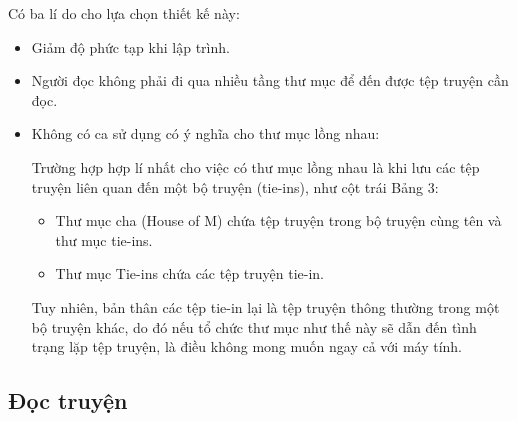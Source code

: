 \documentclass[../../thesis]{subfiles}
\begin{document}
Có ba lí do cho lựa chọn thiết kế này:

\begin{itemize}
    \item
        Giảm độ phức tạp khi lập trình.
    \item
        Người đọc không phải đi qua nhiều tầng thư mục để đến được tệp truyện
        cần đọc.
    \item
        Không có ca sử dụng có ý nghĩa cho thư mục lồng nhau:

        Trường hợp hợp lí nhất cho việc có thư mục lồng nhau là khi lưu các tệp
        truyện liên quan đến một bộ truyện (tie-ins), như cột trái Bảng 3:

        \begin{itemize}
            \item
                Thư mục cha (House of M) chứa tệp truyện trong bộ truyện cùng
                tên và thư mục tie-ins.
            \item
                Thư mục Tie-ins chứa các tệp truyện tie-in.
        \end{itemize}

        Tuy nhiên, bản thân các tệp tie-in lại là tệp truyện thông thường trong
        một bộ truyện khác, do đó nếu tổ chức thư mục như thế này sẽ dẫn đến
        tình trạng lặp tệp truyện, là điều không mong muốn ngay cả với máy tính.
\end{itemize}

\subsection{Đọc truyện}\label{sec:read-comic}
\end{document}
